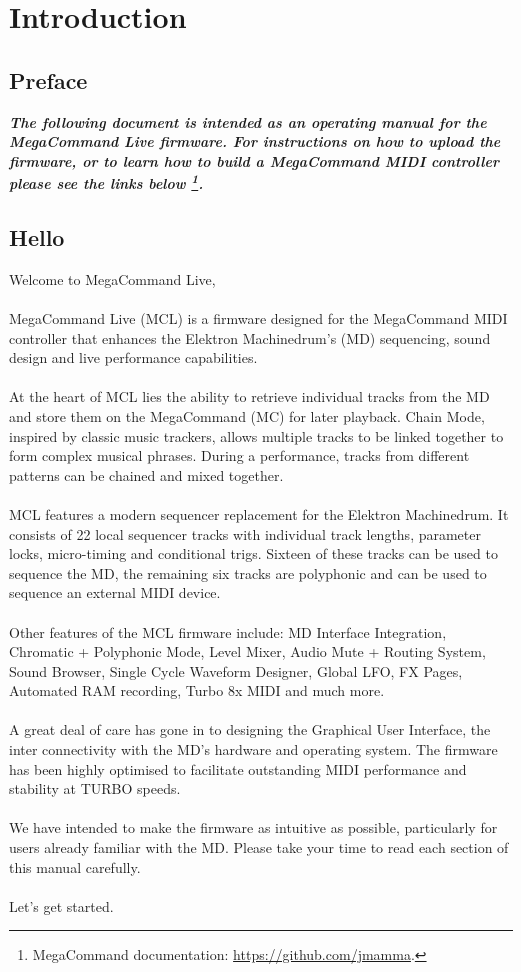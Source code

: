 \chapter{Introduction}

\section{Preface}

\begin{small}
\textbf{\textit{The following document is intended as an operating manual for the MegaCommand Live firmware. For instructions on how to upload the firmware, or to learn how to build a MegaCommand MIDI controller please see the links below \footnote{MegaCommand documentation: \url{https://github.com/jmamma}.}.}}
\end{small}

\section{Hello}
Welcome to MegaCommand Live, 
\\
\\
MegaCommand Live (MCL) is a firmware designed for the MegaCommand MIDI controller that enhances the Elektron Machinedrum's (MD) sequencing, sound design and live performance capabilities.
\\
\\
At the heart of MCL lies the ability to retrieve individual tracks from the MD and store them on the MegaCommand (MC) for later playback. Chain Mode, inspired by classic music trackers, allows multiple tracks to be linked together to form complex musical phrases. During a performance, tracks from different patterns can be chained and mixed together.
\\
\\
MCL features a modern sequencer replacement for the Elektron Machinedrum. It consists of 22 local sequencer tracks with individual track lengths, parameter locks, micro-timing and conditional trigs. Sixteen of these tracks can be used to sequence the MD, the remaining six tracks are polyphonic and can be used to sequence an external MIDI device.
\\
\\
Other features of the MCL firmware include: MD Interface Integration, Chromatic + Polyphonic Mode,  Level Mixer, Audio Mute + Routing System, Sound Browser, Single Cycle Waveform Designer, Global LFO, FX Pages, Automated RAM recording, Turbo 8x MIDI and much more.
\\
\\
A great deal of care has gone in to designing the Graphical User Interface, the inter connectivity with the MD's hardware and operating system. The firmware has been highly optimised to facilitate outstanding MIDI performance and stability at TURBO speeds.
\\
\\
We have intended to make the firmware as intuitive as possible, particularly for users already familiar with the MD. Please take your time to read each section of this manual carefully. 
\\
\\
Let's get started.